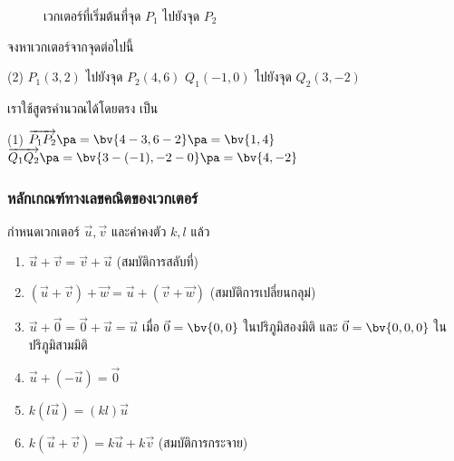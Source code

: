 \begin{frame}
\begin{figure}[h!]
\centering
{}
\caption{เวกเตอร์ที่เริ่มต้นที่จุด $P_1$ ไปยังจุด $P_2$}
\end{figure}
\end{frame}


\begin{frame}[t]
\begin{ex}{}
จงหาเวกเตอร์จากจุดต่อไปนี้
\begin{tasks}(2)
\task $P_1(3,2)$ ไปยังจุด $P_2(4,6)$
\task $Q_1(-1,0)$ ไปยังจุด $Q_2(3,-2)$
\end{tasks}
\end{ex}
\begin{sol}
เราใช้สูตรคำนวณได้โดยตรง \pa เป็น
\begin{tasks}(1)
\task $\overrightarrow{P_1P_2} \pa = \bv{4-3, 6-2} \pa = \bv{1,4}$ \pa
\task $\overrightarrow{Q_1Q_2} \pa = \bv{3-(-1), -2-0} \pa = \bv{4,-2}$
\end{tasks}
\end{sol}
\end{frame}

\begin{frame}
\frametitle{หลักเกณฑ์ทางเลขคณิตของเวกเตอร์}
\begin{prop}{}{}
กำหนดเวกเตอร์ $\vec{u}, \vec{v}$ และค่าคงตัว $k,l$ แล้ว
\begin{enumerate}
\item $\vec{u} + \vec{v} = \vec{v} + \vec{u}$ (สมบัติการสลับที่) \pa
\item $(\vec{u} + \vec{v}) + \vec{w} = \vec{u} + (\vec{v} + \vec{w})$ (สมบัติการเปลี่ยนกลุม่) \pa
\item $\vec{u} + \vec{0} = \vec{0} + \vec{u} = \vec{u}$ \pa เมื่อ $\vec{0} = \bv{0,0}$ ในปริภูมิสองมิติ และ $\vec{0} = \bv{0,0,0}$ ในปริภูมิสามมิติ
\item $\vec{u} + (-\vec{u}) = \vec{0}$ \pa
\item $k(l \vec{u}) = (kl) \vec{u}$ \pa
\item $k(\vec{u} + \vec{v}) = k\vec{u} + k\vec{v}$ (สมบัติการกระจาย)
\end{enumerate}
\end{prop}
\end{frame}


